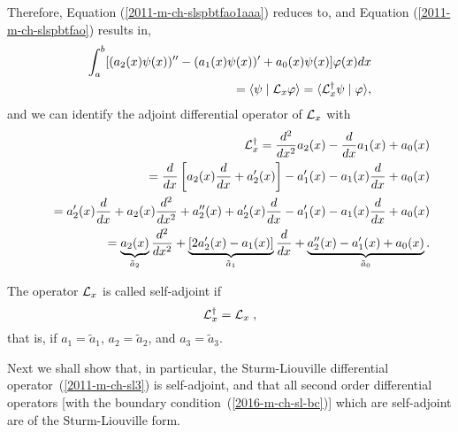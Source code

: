 Therefore, Equation (\ref{2011-m-ch-slspbtfao1aaa}) reduces to, and
Equation (\ref{2011-m-ch-slspbtfao}) results in,
\begin{equation}
\begin{split}
  \int_a^b
[( a_2(x)\psi (x) )'' - ( a_1(x)\psi (x)  )'    + a_0(x) \psi (x)] \varphi(x)
dx  \\
=  \langle  \psi \mid {\cal L}_x \varphi \rangle
=  \langle {\cal L}_x^\dagger \psi \mid  \varphi \rangle
,
\label{2011-m-ch-slspbtfao1aaa1}
\end{split}
\end{equation}
and we can identify the adjoint differential operator of ${\cal L}_x$ with
\begin{equation}
\begin{split}
{\cal L}_x^\dagger
=\frac{d^2}{dx^2}  a_2(x)  - \frac{d }{dx } a_1(x)    + a_0(x) \\
\qquad =
\frac{d}{dx} \left[ a_2(x) \frac{d}{dx} + a'_2(x)\right]  - a'_1(x) - a_1(x)\frac{d }{dx }    + a_0(x) \\
\qquad =
 a'_2(x) \frac{d}{dx} + a_2(x) \frac{d^2}{dx^2} + a''_2(x) + a'_2(x)\frac{d}{dx}
  - a'_1(x) - a_1(x)\frac{d }{dx }    + a_0(x)  \\
\qquad =
 \underbrace{a_2(x)}_{\tilde{a}_2} \frac{d^2}{dx^2}
+
\underbrace{[2 a'_2(x)- a_1(x) ]}_{\tilde{a}_1}  \frac{d}{dx}
+ \underbrace{a''_2(x)   - a'_1(x)   + a_0(x)}_{\tilde{a}_0}
.
\end{split}
\label{2011-m-ch-slspbtfaob}
\end{equation}

The operator ${\cal L}_x$ is called self-adjoint if
\begin{equation}
{\cal L}_x^\dagger
=  {\cal L}_x \;
,
\label{2011-m-ch-slspbtfaob1}
\end{equation}
that is, if
$a_1 = \tilde{a}_1$,
$a_2 = \tilde{a}_2$, and
$a_3 = \tilde{a}_3$.

Next we shall show that, in particular, the Sturm-Liouville differential operator~(\ref{2011-m-ch-sl3}) is self-adjoint,
and that all second order differential operators [with the boundary condition~(\ref{2016-m-ch-sl-bc})] which are  self-adjoint
are of the Sturm-Liouville form.

